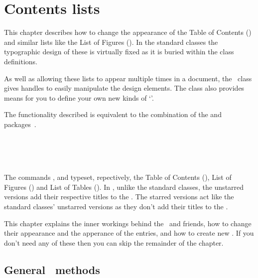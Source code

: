 \chapter{Contents lists} \label{chap:toc}

This chapter describes how to change the appearance of the Table of Contents
(\toc) and similar lists like the List of Figures (\lof). In the standard
classes the typographic design of these is virtually fixed as it is buried
within the class definitions.

    As well as allowing these lists to appear multiple times in a
document, the \Mname\ class gives handles to easily manipulate the design 
elements. The class also provides means for you to define your own new kinds of
`\listofx'. 

    The functionality described is equivalent to the combination
of the  and  
packages~\cite{TOCLOFT,TOCBIBIND}.

\begin{syntax}
\cmd{\tableofcontents} \cmd{\tableofcontents*} \\
\cmd{\listoffigures} \cmd{\listoffigures*} \\
\cmd{\listoftables} \cmd{\listoftables*} \\
\end{syntax}
The commands \cmd{\tableofcontents}, \cmd{\listoffigures} and 
\cmd{\listoftables} typeset, repectively, the Table of Contents (\toc),
List of Figures (\lof) and List of Tables (\lot). In \Mname, unlike the 
standard classes, the unstarred versions add their respective titles to 
the \toc. The starred versions act like the standard classes' unstarred 
versions as they don't add their titles to the \toc.

    This chapter explains the inner workings behind the \toc\ and friends,
how to change their appearance and the apperance of the entries, and how to
create new \listofx. If you don't need any of these then you can
skip the remainder of the chapter.

 \section{General \prtoc\ methods}

